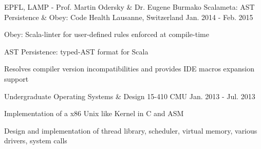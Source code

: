 \begin{cventries}
\cventry
{EPFL, LAMP - Prof. Martin Odersky \& Dr. Eugene Burmako}
{Scalameta: AST Persistence \& Obey: Code Health}
{Lausanne, Switzerland}
{Jan. 2014 - Feb. 2015}
{
	\begin{cvitems}
	\item{Obey: Scala-linter for user-defined rules enforced at compile-time}
  \item{AST Persistence: typed-AST format for Scala}
  \item{Resolves compiler version incompatibilities and provides IDE macros expansion support}
	\end{cvitems}
}

\cventry
{Undergraduate} %
{Operating Systems \& Design 15-410} %
{CMU} %
{Jan. 2013 - Jul. 2013} %
{ %
\begin{cvitems}
\item {Implementation of a x86 Unix like Kernel in C and ASM}
\item{Design and implementation of thread library, scheduler, virtual memory, various drivers, system calls}
\end{cvitems}
}

\end{cventries}
